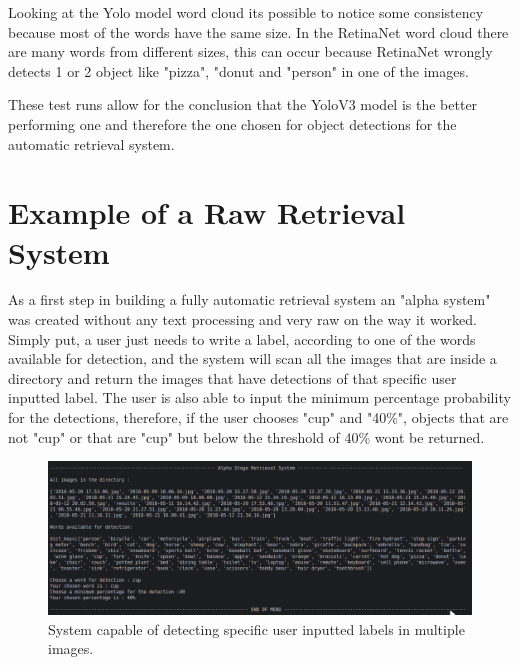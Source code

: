      Looking at the Yolo model word cloud its possible to notice some consistency because most of the words have the same size. In the RetinaNet word cloud there are many words from different sizes, this can occur because RetinaNet wrongly detects 1 or 2 object like "pizza", "donut and "person" in one of the images.

     These test runs allow for the conclusion that the YoloV3 model is the better performing one and therefore the one chosen for object detections for the automatic retrieval system. 

\section{Example of a Raw Retrieval System}
\label{sec:alpha_retrieval}

As a first step in building a fully automatic retrieval system an "alpha system" was created without any text processing and very raw on the way it worked. Simply put, a user just needs to write a label, according to one of the words available for detection, and the system will scan all the images that are inside a directory and return the images that have detections of that specific user inputted label. The user is also able to input the minimum percentage probability for the detections, therefore, if the user chooses "cup" and "40\%", objects that are not "cup" or that are "cup" but below the threshold of 40\% wont be returned.

\begin{figure}[H]
  \centering
  \includegraphics[width = \textwidth]{Sections/4InitialWork/4_images_random/alpha.png}
  \caption{System capable of detecting specific user inputted labels in multiple images. }
  \label{fig:yolov3} 
\end{figure}




